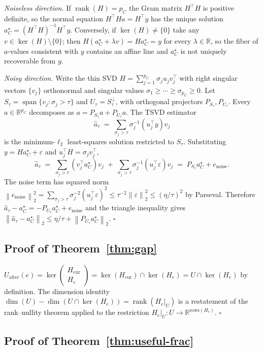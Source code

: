 \documentclass{article}
\newcommand{\rank}{\operatorname{rank}}
\newcommand{\real}{\mathbb{R}}
\newcommand{\norm}[1]{\left\lVert #1 \right\rVert}
\theoremstyle{plain}
\theoremstyle{definition}
\theoremstyle{remark}
\begin{document}
\emph{Noiseless direction.} If $\rank(H)=p_C$ the Gram matrix $H^\top H$ is
positive definite, so the normal equation $H^\top H a=H^\top y$ has the
unique solution $a^{\star}_C=(H^\top H)^{-1}H^\top y$. Conversely, if
$\ker(H)\neq\{0\}$ take any $v\in\ker(H)\setminus\{0\}$; then
$H(a^{\star}_C+\lambda v)=Ha^{\star}_C=y$ for every $\lambda\in\real$, so
the fiber of $a$-values consistent with $y$ contains an affine line and
$a^{\star}_C$ is not uniquely recoverable from $y$.

\emph{Noisy direction.} Write the thin SVD
$H=\sum_{j=1}^{p_C}\sigma_j u_j v_j^\top$ with right singular vectors
$\{v_j\}$ orthonormal and singular values $\sigma_1\ge\cdots\ge\sigma_{p_C}\ge 0$.
Let $S_\tau=\operatorname{span}\{v_j:\sigma_j>\tau\}$ and
$U_\tau=S_\tau^\perp$, with orthogonal projectors $P_{S_\tau},P_{U_\tau}$.
Every $a\in\real^{p_C}$ decomposes as $a=P_{S_\tau}a+P_{U_\tau}a$. The TSVD
estimator
\[
\hat a_\tau \;=\; \sum_{\sigma_j>\tau}\sigma_j^{-1}(u_j^\top y)v_j
\]
is the minimum-$\ell_2$ least-squares solution restricted to $S_\tau$.
Substituting $y=Ha^{\star}_C+\varepsilon$ and
$u_j^\top H = \sigma_j v_j^\top$,
\[
\hat a_\tau \;=\; \sum_{\sigma_j>\tau}(v_j^\top a^{\star}_C)v_j
\;+\; \sum_{\sigma_j>\tau}\sigma_j^{-1}(u_j^\top\varepsilon)v_j
\;=\; P_{S_\tau}a^{\star}_C + e_{\mathrm{noise}}.
\]
The noise term has squared norm
$\norm{e_{\mathrm{noise}}}_2^2=\sum_{\sigma_j>\tau}\sigma_j^{-2}(u_j^\top\varepsilon)^2\le\tau^{-2}\norm{\varepsilon}_2^2\le(\eta/\tau)^2$
by Parseval. Therefore
$\hat a_\tau-a^{\star}_C=-P_{U_\tau}a^{\star}_C+e_{\mathrm{noise}}$ and the
triangle inequality gives
$\norm{\hat a_\tau-a^{\star}_C}_2\le\eta/\tau+\norm{P_{U_\tau}a^{\star}_C}_2$.
\hfill$\square$

\subsection{Proof of Theorem~\ref{thm:gap}}

$U_{\mathrm{after}}(e)=\ker\!\begin{pmatrix}H_{\mathrm{cur}}\\ H_e\end{pmatrix}
= \ker(H_{\mathrm{cur}})\cap\ker(H_e)=U\cap\ker(H_e)$ by definition.
The dimension identity $\dim(U)-\dim(U\cap\ker(H_e))=\rank(H_e\vert_U)$ is a
restatement of the rank--nullity theorem applied to the restriction
$H_e\vert_U:U\to\real^{\mathrm{rows}(H_e)}$. \hfill$\square$

\subsection{Proof of Theorem~\ref{thm:useful-frac}}
\end{document}
